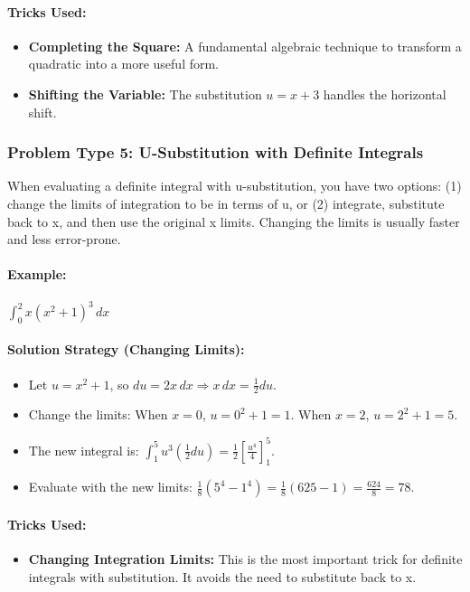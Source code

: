 \documentclass{article}
\begin{document}
\paragraph{Tricks Used:}
\begin{itemize}
    \item \textbf{Completing the Square:} A fundamental algebraic technique to transform a quadratic into a more useful form.
    \item \textbf{Shifting the Variable:} The substitution $u=x+3$ handles the horizontal shift.
\end{itemize}

\subsubsection{Problem Type 5: U-Substitution with Definite Integrals}
When evaluating a definite integral with u-substitution, you have two options: (1) change the limits of integration to be in terms of u, or (2) integrate, substitute back to x, and then use the original x limits. Changing the limits is usually faster and less error-prone.
\paragraph{Example:} $ \int_0^2 x(x^2+1)^3 \,dx $
\paragraph{Solution Strategy (Changing Limits):}
\begin{itemize}
    \item Let $u = x^2+1$, so $du = 2x \,dx \Rightarrow x \,dx = \frac{1}{2}du$.
    \item Change the limits: When $x=0$, $u = 0^2+1=1$. When $x=2$, $u = 2^2+1=5$.
    \item The new integral is: $\int_1^5 u^3 (\frac{1}{2}du) = \frac{1}{2}\left[ \frac{u^4}{4} \right]_1^5$.
    \item Evaluate with the new limits: $\frac{1}{8}(5^4 - 1^4) = \frac{1}{8}(625-1) = \frac{624}{8} = 78$.
\end{itemize}
\paragraph{Tricks Used:}
\begin{itemize}
    \item \textbf{Changing Integration Limits:} This is the most important trick for definite integrals with substitution. It avoids the need to substitute back to x.
\end{itemize}
\end{document}
